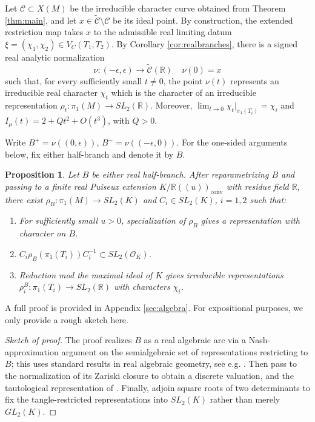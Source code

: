 \documentclass{article}
\theoremstyle{plain}
\theoremstyle{definition}
\theoremstyle{plain}
\newtheorem{prop}[theorem]{Proposition}
\theoremstyle{plain}
\theoremstyle{plain}
\theoremstyle{remark}
\theoremstyle{remark}
\theoremstyle{plain}
\theoremstyle{plain}
\newcounter{main}
\theoremstyle{plain}
\theoremstyle{plain}
\begin{document}
\medskip

Let $\mathcal C\subset X(M)$ be the irreducible character curve obtained from Theorem \ref{thm:main}, and let $x\in\widetilde{\mathcal C}\setminus\mathcal C$ be its ideal point. By construction, the extended restriction map takes $x$ to the admissible real limiting datum $\xi=(\chi_1,\chi_2)\in V_C(T_1,T_2)$. By Corollary \ref{cor:realbranches}, there is a signed real analytic normalization
\begin{equation*}
	\nu:(-\epsilon,\epsilon) \longrightarrow\widetilde{\mathcal C}(\mathbb R) \ \ \ \ \ \nu(0)=x
\end{equation*} 
such that, for every sufficiently small $t\neq0$, the point $\nu(t)$ represents an irreducible real character $\chi_t$ which is the character of an irreducible representation $\rho_t:\pi_1(M)\longrightarrow SL_2(\mathbb R)$. Moreover, $\lim_{t\to0}\chi_t|_{\pi_1(T_i)}=\chi_i$ and $I_\mu(t)=2+Qt^2+O(t^3)$, with $Q > 0$.

\medskip

Write $B^+=\nu((0,\epsilon))$, $B^-=\nu((-\epsilon,0))$. For the one-sided arguments below, fix either half-branch and denote it by $B$.

\begin{prop}\label{prop:branchmodel}
Let $B$ be either real half-branch. After reparametrizing $B$ and passing to a finite real Puiseux extension $K/\mathbb{R}((u))_{\mathrm{conv}}$ with residue field $\mathbb R$, there exist $\rho_B: \pi_1(M) \to SL_2(K)$ and $C_i \in SL_2(K)$, $i = 1, 2$ such that:
\begin{enumerate}
	\item For sufficiently small $u > 0$, specialization of $\rho_B$ gives a representation with character on $B$.
	\item $C_i\rho_B(\pi_1(T_i))C_i^{-1} \subset SL_2(\mathcal O_K)$.
	\item Reduction mod the maximal ideal of $K$ gives irreducible representations $\rho_i^B: \pi_1(T_i) \to SL_2(\mathbb{R})$ with characters $\chi_i$. 
\end{enumerate}
\end{prop}

A full proof is provided in Appendix \ref{sec:algebra}. For expositional purposes, we only provide a rough sketch here.

\begin{proof}[Sketch of proof]
The proof realizes $B$ as a real algebraic arc via a Nash-approximation argument on the semialgebraic set of representations restricting to $B$; this uses standard results in real algebraic geometry, see e.g. \cite{bochnak-coste-roy}. Then pass to the normalization of its Zariski closure to obtain a discrete valuation, and the tautological representation of \cite{cullershalen}. Finally, adjoin square roots of two determinants to fix the tangle-restricted representations into $SL_2(K)$ rather than merely $GL_2(K)$. 
\end{proof}
\end{document}
